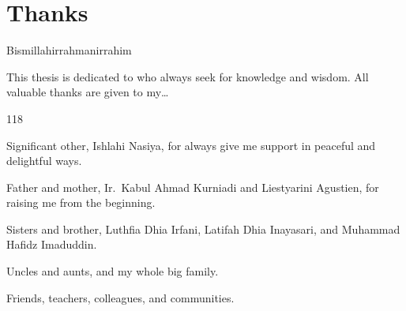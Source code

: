 
\begingroup
\let\clearpage\relax
\let\cleardoublepage\relax

\chapter{Thanks}
\label{chap:thanks}

Bismillahirrahmanirrahim

\noindent This thesis is dedicated to who always seek for knowledge and wisdom.
\noindent All valuable thanks are given to my\ldots

\hfill

\begin{dinglist}{118}
\item Significant other, Ishlahi Nasiya, for always give me support in peaceful and delightful ways.
\item Father and mother, Ir.\ Kabul Ahmad Kurniadi and Liestyarini Agustien, for raising me from the beginning.
\item Sisters and brother, Luthfia Dhia Irfani, Latifah Dhia Inayasari, and Muhammad Hafidz Imaduddin.
\item Uncles and aunts, and my whole big family.
\item Friends, teachers, colleagues, and communities.
\end{dinglist}

\endgroup

